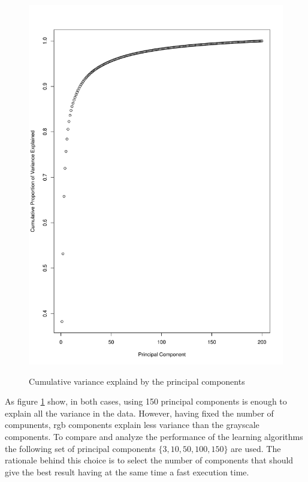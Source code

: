 \documentclass{article}
\begin{document}
\begin{figure}[H]
\begin{adjustwidth}{-4cm}{-4cm}
{    \includegraphics[scale=0.3]{../cumulative_variance_grb.pdf} 
     }
     \centering
     \caption{Cumulative variance explaind by the principal components}  \label{variance}
      \end{adjustwidth} 
   \end{figure}

\noindent As figure \ref{variance} show, in both cases, using 150 principal components is enough to explain all the variance in the data. However, having fixed the number of compunents, rgb components explain less variance than the grayscale components. To compare and analyze the performance of the learning algorithms the following set of principal components $\{3,10,50,100,150\}$ are used. The rationale behind this choice is to select the number of components that should give the best result having at the same time a fast execution time. \\
 
\end{document}

